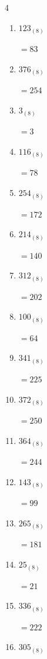 \begin{multicols}{4}
\begin{enumerate}
        $=63$

  \item $123_{(8)}$

        $=83$

  \item $376_{(8)}$

        $=254$

  \item $3_{(8)}$

        $=3$

  \item $116_{(8)}$

        $=78$

  \item $254_{(8)}$

        $=172$

  \item $214_{(8)}$

        $=140$

\columnbreak %

\resetques

  \item $312_{(8)}$

        $=202$

  \item $100_{(8)}$

        $=64$

  \item $341_{(8)}$

        $=225$

  \item $372_{(8)}$

        $=250$

  \item $364_{(8)}$

        $=244$

  \item $143_{(8)}$

        $=99$

  \item $265_{(8)}$

        $=181$

  \item $25_{(8)}$

        $=21$

  \item $336_{(8)}$

        $=222$

  \item $305_{(8)}$


\end{enumerate}
\end{multicols}
